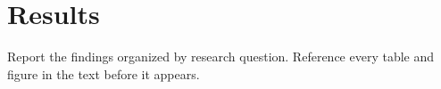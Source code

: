 \section{Results}\label{sec:results}


Report the findings organized by research question. Reference every table and
figure in the text before it appears.

